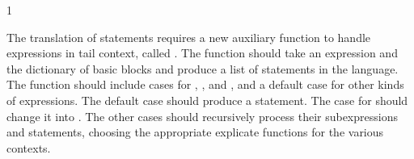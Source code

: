 \documentclass[7x10]{TimesAPriori_MIT}%
\def\pythonEd{1}
\providecommand{\BookEdition}{1}
\let\edition\BookEdition
\newcommand{\pythonColor}[0]{}
\numberwithin{theorem}{chapter}
\numberwithin{definition}{chapter}
\numberwithin{equation}{chapter}
\begin{document}
{\if\edition\pythonEd\pythonColor

The translation of  statements requires a new auxiliary
function to handle expressions in tail context, called
. The function should take an expression and the
dictionary of basic blocks and produce a list of statements in the
\LangCFun{} language.  The  function should
include cases for , , and ,
and a default case for other kinds of expressions. The default case
should produce a  statement. The case for 
should change it into .  The other cases should
recursively process their subexpressions and statements, choosing the
appropriate explicate functions for the various contexts.
  
\fi}

\newcommand{\CfunASTRacket}{
\begin{array}{lcl}
\Exp &::= & \FUNREF{\itm{label}}{\Int} \MID \CALL{\Atm}{\LP\Atm\ldots\RP} \\
\Tail &::= & \TAILCALL{\Atm}{\Atm\ldots} \\
\Def &::=& \DEF{\itm{label}}{\LP[\Var\key{:}\Type]\ldots\RP}{\Type}{\itm{info}}{\LP\LP\itm{label}\,\key{.}\,\Tail\RP\ldots\RP}
\end{array}
}

\newcommand{\CfunASTPython}{
\begin{array}{lcl}
\Exp &::= & \FUNREF{\itm{label}}{\Int} \MID \CALL{\Atm}{\Atm^{*}} \\
\Tail &::= & \TAILCALL{\Atm}{\Atm^{*}} \\
\Params &::=& \LS\LP\Var\key{,}\Type\RP\code{,}\ldots\RS \\
\Block &::=& \itm{label}\key{:} \Stmt^{*}\;\Tail \\
\Def &::=& \DEF{\itm{label}}{\Params}{\LC\Block\code{,}\ldots\RC}{\key{None}}{\Type}{\key{None}} 
\end{array}
}
\end{document}
